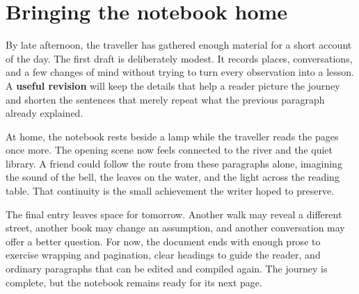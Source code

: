 \section{Bringing the notebook home}
By late afternoon, the traveller has gathered enough material for a short account of the day. The first draft is deliberately modest. It records places, conversations, and a few changes of mind without trying to turn every observation into a lesson. A \textbf{useful revision} will keep the details that help a reader picture the journey and shorten the sentences that merely repeat what the previous paragraph already explained.

At home, the notebook rests beside a lamp while the traveller reads the pages once more. The opening scene now feels connected to the river and the quiet library. A friend could follow the route from these paragraphs alone, imagining the sound of the bell, the leaves on the water, and the light across the reading table. That continuity is the small achievement the writer hoped to preserve.

The final entry leaves space for tomorrow. Another walk may reveal a different street, another book may change an assumption, and another conversation may offer a better question. For now, the document ends with enough prose to exercise wrapping and pagination, clear headings to guide the reader, and ordinary paragraphs that can be edited and compiled again. The journey is complete, but the notebook remains ready for its next page.

